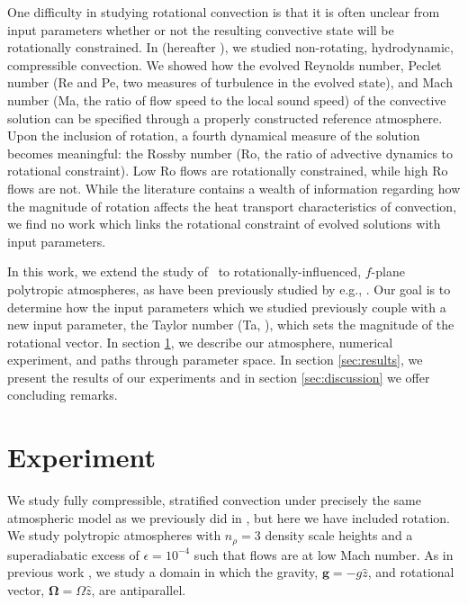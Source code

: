\documentclass[twocolumn, amsmath, amsfonts, amssymb]{aastex62}
\begin{document}
One difficulty in studying rotational convection is that it is often unclear
from input parameters whether or not the resulting convective state will be rotationally
constrained. In \cite{anders&brown2017} (hereafter \AB), we studied non-rotating, hydrodynamic, 
compressible convection. We showed how the evolved Reynolds number, Peclet number
(Re and Pe, two measures of turbulence in the evolved state), and Mach number
(Ma, the ratio of flow speed to the local sound speed) of the convective solution
can be specified through a properly constructed reference atmosphere. Upon the inclusion
of rotation, a fourth dynamical measure of the solution becomes meaningful: the
Rossby number (Ro, the ratio of advective dynamics to rotational constraint). Low
Ro flows are rotationally constrained, while high Ro flows are not. While the literature
contains a wealth of information regarding how the magnitude of rotation affects the
heat transport characteristics of convection, we find no work which links
the rotational constraint of evolved solutions with input parameters.

In this work, we extend the study of \AB$\,$ to rotationally-influenced, $f$-plane
polytropic atmospheres, as have been previously studied by e.g.,
\cite{brummell&all1996, brummell&all1998, calkins&all2015a}. Our goal is to determine
how the input parameters which we studied previously couple with a new input
parameter, the Taylor number (Ta, \cite{julien&all1996}), which sets the magnitude of the
rotational vector. In section  \ref{sec:experiment}, we describe our atmosphere, numerical
experiment, and paths through parameter space. In section \ref{sec:results}, we present
the results of our experiments and in section \ref{sec:discussion} we offer concluding remarks.

\section{Experiment} 
\label{sec:experiment}


We study fully compressible, stratified 
convection under precisely the same atmospheric model
as we previously did in \AB, but here
we have included rotation. We study polytropic atmospheres
with $n_\rho = 3$ density scale heights and a superadiabatic
excess of $\epsilon = 10^{-4}$ such that flows are at low Mach number.
As in previous work \citep{julien&all1996, brummell&all1996}, 
we study a domain in which the
gravity, $\bm{g} = -g\hat{z}$, and rotational vector, $\bm{\Omega} = \Omega \hat{z}$, 
are antiparallel.
\end{document}
